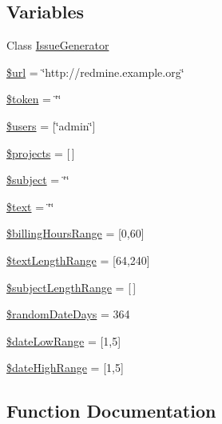 \subsection*{Variables}
\begin{DoxyCompactItemize}
\item 
Class \mbox{\hyperlink{namespace_redmine_ab0fb626e08a4e2863ce0701d1539b043}{Issue\+Generator}}
\item 
\mbox{\hyperlink{namespace_redmine_aae663160ee40da764967a699dd5fbbe5}{\$url}} = \char`\"{}http\+://redmine.\+example.\+org\char`\"{}
\item 
\mbox{\hyperlink{namespace_redmine_af35ef66fbfaff27c9b9fee3af83aead8}{\$token}} = \char`\"{}\char`\"{}
\item 
\mbox{\hyperlink{namespace_redmine_a7053bf0e8991cc3d8b797140b7998f16}{\$users}} = \mbox{[}\char`\"{}admin\char`\"{}\mbox{]}
\item 
\mbox{\hyperlink{namespace_redmine_a8b45f4e08d41649324ad1f604cebbaae}{\$projects}} = \mbox{[}$\,$\mbox{]}
\item 
\mbox{\hyperlink{namespace_redmine_aaaacf5ec70a64626187799a2ef952359}{\$subject}} = \char`\"{}\char`\"{}
\item 
\mbox{\hyperlink{namespace_redmine_a7e88a99f5ec14d688bb904a2dc5596cc}{\$text}} = \char`\"{}\char`\"{}
\item 
\mbox{\hyperlink{namespace_redmine_aa2eb1c85048add3a8487c091df7a7de0}{\$billing\+Hours\+Range}} = \mbox{[}0,60\mbox{]}
\item 
\mbox{\hyperlink{namespace_redmine_a4ac80590cf30689fbdc00c8c102e7145}{\$text\+Length\+Range}} = \mbox{[}64,240\mbox{]}
\item 
\mbox{\hyperlink{namespace_redmine_ace7543b94df52916c5952a5f727d0563}{\$subject\+Length\+Range}} = \mbox{[}$\,$\mbox{]}
\item 
\mbox{\hyperlink{namespace_redmine_ae79d9d8a3382e493ff824bfa7b3b023a}{\$random\+Date\+Days}} = 364
\item 
\mbox{\hyperlink{namespace_redmine_aac536a4553d683b37596fe4c8175db31}{\$date\+Low\+Range}} = \mbox{[}1,5\mbox{]}
\item 
\mbox{\hyperlink{namespace_redmine_addc1d11062505beb178bff37c0d15543}{\$date\+High\+Range}} = \mbox{[}1,5\mbox{]}
\end{DoxyCompactItemize}


\subsection{Function Documentation}
\mbox{\label{namespace_redmine_a045be2207229835f92d397ee3e31f0e6}} 
